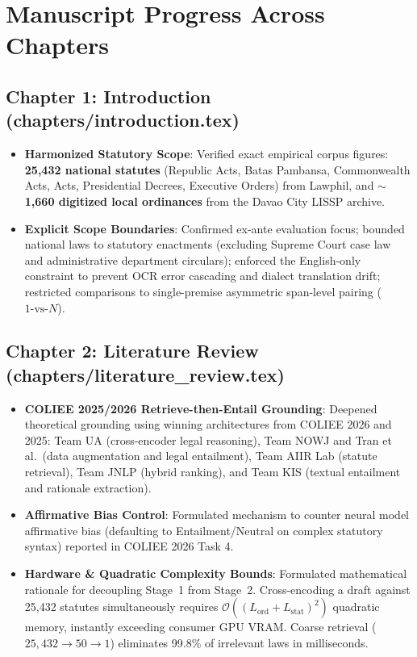 \documentclass[10pt,letterpaper]{article}
\begin{document}
\section{Manuscript Progress Across Chapters}

\subsection{Chapter 1: Introduction (chapters/introduction.tex)}
\begin{itemize}
    \item \textbf{Harmonized Statutory Scope}: Verified exact empirical corpus figures: \textbf{25,432 national statutes} (Republic Acts, Batas Pambansa, Commonwealth Acts, Acts, Presidential Decrees, Executive Orders) from Lawphil, and \textbf{$\sim$1,660 digitized local ordinances} from the Davao City LISSP archive.
    \item \textbf{Explicit Scope Boundaries}: Confirmed ex-ante evaluation focus; bounded national laws to statutory enactments (excluding Supreme Court case law and administrative department circulars); enforced the English-only constraint to prevent OCR error cascading and dialect translation drift; restricted comparisons to single-premise asymmetric span-level pairing ($1\text{-vs-}N$).
\end{itemize}

\subsection{Chapter 2: Literature Review (chapters/literature\_review.tex)}
\begin{itemize}
    \item \textbf{COLIEE 2025/2026 Retrieve-then-Entail Grounding}: Deepened theoretical grounding using winning architectures from COLIEE 2026 and 2025: Team UA (cross-encoder legal reasoning), Team NOWJ and Tran et al.\ (data augmentation and legal entailment), Team AIIR Lab (statute retrieval), Team JNLP (hybrid ranking), and Team KIS (textual entailment and rationale extraction).
    \item \textbf{Affirmative Bias Control}: Formulated mechanism to counter neural model affirmative bias (defaulting to Entailment/Neutral on complex statutory syntax) reported in COLIEE 2026 Task 4.
    \item \textbf{Hardware \& Quadratic Complexity Bounds}: Formulated mathematical rationale for decoupling Stage~1 from Stage~2. Cross-encoding a draft against 25,432 statutes simultaneously requires $\mathcal{O}((L_{\text{ord}} + L_{\text{stat}})^2)$ quadratic memory, instantly exceeding consumer GPU VRAM. Coarse retrieval ($25,432 \rightarrow 50 \rightarrow 1$) eliminates 99.8\% of irrelevant laws in milliseconds.
\end{itemize}
\end{document}
